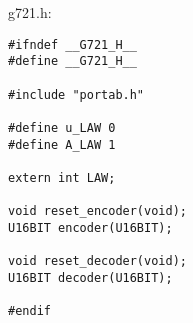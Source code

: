 g721.h:

\begin{verbatim}
#ifndef __G721_H__
#define __G721_H__

#include "portab.h"

#define u_LAW 0
#define A_LAW 1

extern int LAW;

void reset_encoder(void);
U16BIT encoder(U16BIT);

void reset_decoder(void);
U16BIT decoder(U16BIT);

#endif
\end{verbatim}
